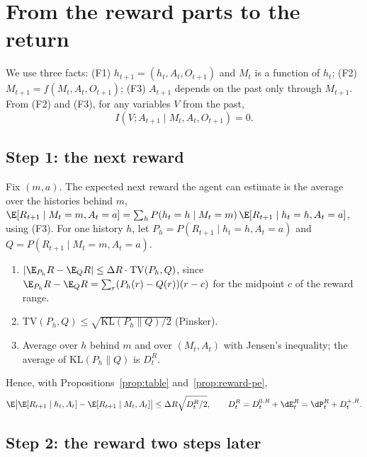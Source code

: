 
\section{From the reward parts to the return}

We use three facts: (F1) $h_{t+1}=(h_t,A_t,O_{t+1})$ and $M_t$ is a function of $h_t$; (F2) $M_{t+1}=f(M_t,A_t,O_{t+1})$; (F3) $A_{t+1}$ depends on the past only through $M_{t+1}$. From (F2) and (F3), for any variables $V$ from the past,
\begin{equation}\label{eq:action-zero}
I(V;A_{t+1}\mid M_t,A_t,O_{t+1})=0 .
\end{equation}

\subsection{Step 1: the next reward}

Fix $(m,a)$. The expected next reward the agent can estimate is the average over the histories behind $m$, $\E[R_{t+1}\mid M_t=m,A_t=a]=\sum_hP(h_t=h\mid M_t=m)\,\E[R_{t+1}\mid h_t=h,A_t=a]$, using (F3). For one history $h$, let $P_h=P(R_{t+1}\mid h_t=h,A_t=a)$ and $Q=P(R_{t+1}\mid M_t=m,A_t=a)$.
\begin{enumerate}
\item $|\E_{P_h}R-\E_QR|\le\Delta R\cdot\mathrm{TV}(P_h,Q)$, since $\E_{P_h}R-\E_QR=\sum_r(P_h(r)-Q(r))(r-c)$ for the midpoint $c$ of the reward range.
\item $\mathrm{TV}(P_h,Q)\le\sqrt{\mathrm{KL}(P_h\|Q)/2}$ (Pinsker).
\item Average over $h$ behind $m$ and over $(M_t,A_t)$ with Jensen's inequality; the average of $\mathrm{KL}(P_h\|Q)$ is $D^R_t$.
\end{enumerate}
Hence, with Propositions~\ref{prop:table} and~\ref{prop:reward-pe},
\[
\E\big|\E[R_{t+1}\mid h_t,A_t]-\E[R_{t+1}\mid M_t,A_t]\big|\le\Delta R\sqrt{D^R_t/2},\qquad D^R_t=D^{0,R}_t+\dE^R_t=\dP^R_t+D^{+,R}_t .
\]

\subsection{Step 2: the reward two steps later}

